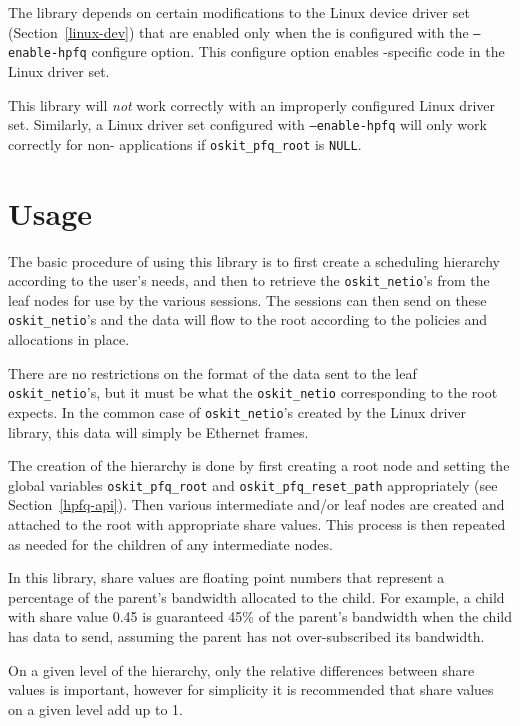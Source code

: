 The \hpfq{} library depends on certain modifications to the \oskit{}
Linux device driver set (Section~\ref{linux-dev}) that are enabled
only when the \oskit{} is configured with the \texttt{--enable-hpfq}
configure option.
This configure option enables \hpfq{}-specific code in the Linux
driver set.

This library will \emph{not} work correctly with an improperly
configured Linux driver set.
Similarly, a Linux driver set configured with \texttt{--enable-hpfq}
will only work correctly for non-\hpfq{} applications if
\texttt{oskit_pfq_root} is \texttt{NULL}.


\section{Usage}
\label{hpfq-usage}

The basic procedure of using this library is to first create a
scheduling hierarchy according to the user's needs,
and then to retrieve the \texttt{oskit_netio}'s from the leaf nodes
for use by the various sessions.
The sessions can then send on these \texttt{oskit_netio}'s and the
data will flow to the root according to the policies and allocations
in place.

There are no restrictions on the format of the data sent
to the leaf \texttt{oskit_netio}'s,
but it must be what the \texttt{oskit_netio} corresponding to the root
expects.
In the common case of \texttt{oskit_netio}'s created by the Linux
driver library,
this data will simply be Ethernet frames.

The creation of the hierarchy is done by first creating a root node
and setting the global variables \texttt{oskit_pfq_root} 
and \texttt{oskit_pfq_reset_path} appropriately
(see Section~\ref{hpfq-api}).
Then various intermediate and/or leaf nodes are created and attached
to the root with appropriate share values.
This process is then repeated as needed for the children of any
intermediate nodes.

In this library, share values are floating point numbers that represent
a percentage of the parent's bandwidth allocated to the child.
For example, a child with share value 0.45 is guaranteed 45\% of the
parent's bandwidth when the child has data to send,
assuming the parent has not over-subscribed its bandwidth.

On a given level of the hierarchy,
only the relative differences between share values is important,
however for simplicity it is recommended that share values on a given
level add up to 1.

